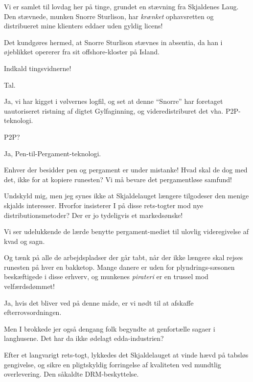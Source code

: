 \documentclass[a4paper,11pt]{article}
\begin{document}
\begin{sketch}


 Vi er samlet til lovdag her på tinge, grundet en stævning
fra Skjaldenes Laug. Den stævnede, munken Snorre Sturlison, har
\textit{krænket} ophavsretten og distribueret mine klienters eddaer
uden gyldig licens!

 Det kundgøres hermed, at Snorre Sturlison stævnes in
absentia, da han i øjeblikket opererer fra sit offshore-kloster på
Island.

 Indkald tingsvidnerne!


 Tal.

 Ja, vi har kigget i vølvernes logfil, og set at denne
``Snorre'' har foretaget uautoriseret ristning af digtet Gylfaginning,
og videredistriburet det vha. P2P-teknologi.

 P2P?

 Ja, Pen-til-Pergament-teknologi.

 Enhver der besidder pen og pergament er under mistanke! Hvad
skal de dog med det, ikke for at kopiere runesten?  Vi må bevare det
pergamentløse samfund!

 Undskyld mig, men jeg synes ikke at Skjaldelauget længere
tilgodeser den menige skjalds interesser. Hvorfor insisterer I på
disse rets-togter mod nye distributionsmetoder? Der er jo tydeligvis
et markedsønske!

 Vi ser udelukkende de lærde benytte pergament-mediet til
ulovlig videregivelse af kvad og sagn.

 Og tænk på alle de arbejdspladser der går tabt, når der ikke
længere skal rejses runesten på hver en bakketop. Mange danere er uden
for plyndrings-sæsonen beskæftigede i disse erhverv, og munkenes
\emph{pirateri} er en trussel mod velfærdsdømmet!

 Ja, hvis det bliver ved på denne måde, er vi nødt til at
afskaffe efterrovsordningen.

 Men I brokkede jer også dengang folk begyndte at genfortælle
sagaer i langhusene.  Det har da ikke ødelagt edda-industrien?

 Efter et langvarigt rets-togt, lykkedes det Skjaldelauget at
vinde hævd på tabsløs gengivelse, og sikre en pligtskyldig forringelse
af kvaliteten ved mundtlig overlevering. Den såkaldte DRM-beskyttelse.


\end{sketch}
\end{document}
